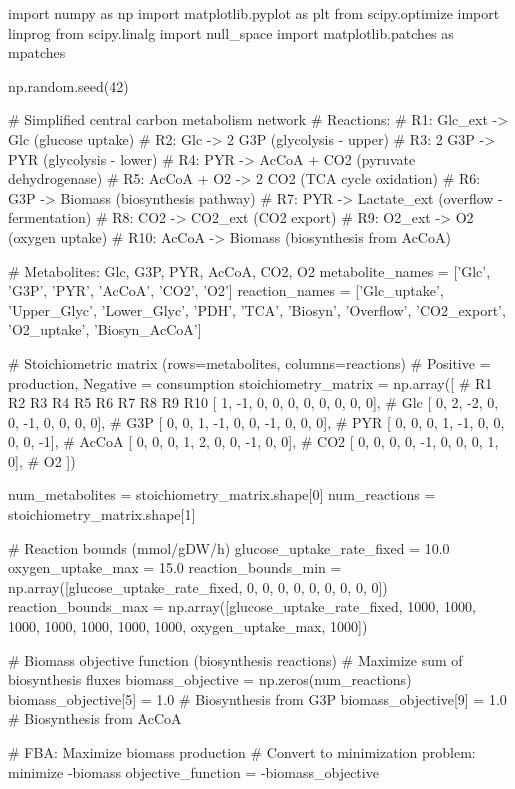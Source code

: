 \documentclass[a4paper, 11pt]{article}
\begin{document}
\begin{pycode}
import numpy as np
import matplotlib.pyplot as plt
from scipy.optimize import linprog
from scipy.linalg import null_space
import matplotlib.patches as mpatches

np.random.seed(42)

# Simplified central carbon metabolism network
# Reactions:
# R1: Glc_ext -> Glc (glucose uptake)
# R2: Glc -> 2 G3P (glycolysis - upper)
# R3: 2 G3P -> PYR (glycolysis - lower)
# R4: PYR -> AcCoA + CO2 (pyruvate dehydrogenase)
# R5: AcCoA + O2 -> 2 CO2 (TCA cycle oxidation)
# R6: G3P -> Biomass (biosynthesis pathway)
# R7: PYR -> Lactate_ext (overflow - fermentation)
# R8: CO2 -> CO2_ext (CO2 export)
# R9: O2_ext -> O2 (oxygen uptake)
# R10: AcCoA -> Biomass (biosynthesis from AcCoA)

# Metabolites: Glc, G3P, PYR, AcCoA, CO2, O2
metabolite_names = ['Glc', 'G3P', 'PYR', 'AcCoA', 'CO2', 'O2']
reaction_names = ['Glc_uptake', 'Upper_Glyc', 'Lower_Glyc', 'PDH', 'TCA',
                  'Biosyn', 'Overflow', 'CO2_export', 'O2_uptake', 'Biosyn_AcCoA']

# Stoichiometric matrix (rows=metabolites, columns=reactions)
# Positive = production, Negative = consumption
stoichiometry_matrix = np.array([
    # R1   R2   R3   R4   R5   R6   R7   R8   R9  R10
    [ 1,  -1,   0,   0,   0,   0,   0,   0,   0,   0],  # Glc
    [ 0,   2,  -2,   0,   0,  -1,   0,   0,   0,   0],  # G3P
    [ 0,   0,   1,  -1,   0,   0,  -1,   0,   0,   0],  # PYR
    [ 0,   0,   0,   1,  -1,   0,   0,   0,   0,  -1],  # AcCoA
    [ 0,   0,   0,   1,   2,   0,   0,  -1,   0,   0],  # CO2
    [ 0,   0,   0,   0,  -1,   0,   0,   0,   1,   0],  # O2
])

num_metabolites = stoichiometry_matrix.shape[0]
num_reactions = stoichiometry_matrix.shape[1]

# Reaction bounds (mmol/gDW/h)
glucose_uptake_rate_fixed = 10.0
oxygen_uptake_max = 15.0
reaction_bounds_min = np.array([glucose_uptake_rate_fixed, 0, 0, 0, 0, 0, 0, 0, 0, 0])
reaction_bounds_max = np.array([glucose_uptake_rate_fixed, 1000, 1000, 1000, 1000,
                                1000, 1000, 1000, oxygen_uptake_max, 1000])

# Biomass objective function (biosynthesis reactions)
# Maximize sum of biosynthesis fluxes
biomass_objective = np.zeros(num_reactions)
biomass_objective[5] = 1.0  # Biosynthesis from G3P
biomass_objective[9] = 1.0  # Biosynthesis from AcCoA

# FBA: Maximize biomass production
# Convert to minimization problem: minimize -biomass
objective_function = -biomass_objective


\end{pycode}
\end{document}
